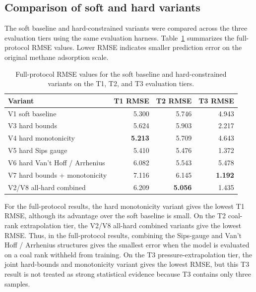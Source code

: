 \documentclass[11pt]{article}
\begin{document}
\subsection{Comparison of soft and hard variants}

The soft baseline and hard-constrained variants were compared across the three
evaluation tiers using the same evaluation harness.
Table~\ref{tab:rmse-comparison} summarizes the full-protocol RMSE values.
Lower RMSE indicates smaller prediction error on the original methane
adsorption scale.

\begin{table}[htbp]
    \centering
    \begin{tabular}{lrrr}
        \toprule
        \textbf{Variant}               & \textbf{T1 RMSE} & \textbf{T2 RMSE} & \textbf{T3 RMSE} \\
        \midrule
        V1 soft baseline               & 5.300            & 5.746            & 4.943            \\
        V3 hard bounds                 & 5.624            & 5.903            & 2.217            \\
        V4 hard monotonicity           & \textbf{5.213}   & 5.709            & 4.643            \\
        V5 hard Sips gauge             & 5.410            & 5.476            & 1.372            \\
        V6 hard Van't Hoff / Arrhenius & 6.082            & 5.543            & 5.478            \\
        V7 hard bounds + monotonicity  & 7.116            & 6.145            & \textbf{1.192}   \\
        V2/V8 all-hard combined        & 6.209            & \textbf{5.056}   & 1.435            \\
        \bottomrule
    \end{tabular}
    \caption{Full-protocol RMSE values for the soft baseline and
        hard-constrained variants on the T1, T2, and T3 evaluation tiers.}
    \label{tab:rmse-comparison}
\end{table}

For the full-protocol results, the hard monotonicity variant gives the lowest T1
RMSE, although its advantage over the soft baseline is small. On the T2
coal-rank extrapolation tier, the V2/V8 all-hard combined variants give the
lowest RMSE. Thus, in the full-protocol results, combining the Sips-gauge and
Van't Hoff / Arrhenius structures gives the smallest error when the model is
evaluated on a coal rank withheld from training. On the T3
pressure-extrapolation tier, the joint hard-bounds and monotonicity variant gives the
lowest RMSE, but this T3 result is not treated as strong statistical evidence
because T3 contains only three samples.
\end{document}

